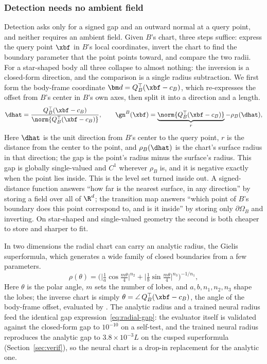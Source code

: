 \subsubsection{Detection needs no ambient field}

Detection asks only for a signed gap and an outward normal at a query point, and neither requires an
ambient field. Given $B$'s chart, three steps suffice: express the query point $\xbf$ in $B$'s local
coordinates, invert the chart to find the boundary parameter that the point points toward, and compare the
two radii. For a star-shaped body all three collapse to almost nothing: the inversion is a closed-form
direction, and the comparison is a single radius subtraction. We first form
the body-frame coordinate $\bm d=Q_B^\top(\xbf-c_B)$, which re-expresses the offset from $B$'s center in
$B$'s own axes, then split it into a direction and a length.
%
\begin{equation}\label{eq:radial-gap}
\dhat=\frac{Q_B^\top(\xbf-c_B)}{\norm{Q_B^\top(\xbf-c_B)}},\qquad
\gn^B(\xbf)=\underbrace{\norm{Q_B^\top(\xbf-c_B)}}_{r}-\rho_B(\dhat),
\end{equation}
%
Here $\dhat$ is the unit direction from $B$'s center to the query point, $r$ is the distance from the
center to the point, and $\rho_B(\dhat)$ is the chart's surface radius in that direction; the gap is the
point's radius minus the surface's radius. This gap is globally single-valued and $C^1$ wherever $\rho_B$
is, and it is negative exactly when the point lies inside. This is the level set turned inside out. A
signed-distance function answers ``how far is the nearest surface, in any direction'' by storing a field
over all of $\R^d$; the transition map answers ``which point of $B$'s boundary does this point correspond
to, and is it inside'' by storing only $\partial\Omega_B$ and inverting. On star-shaped and single-valued
geometry the second is both cheaper to store and sharper to fit.

In two dimensions the radial chart can carry an analytic radius, the Gielis superformula, which generates
a wide family of closed boundaries from a few parameters.
%
\begin{equation}\label{eq:superformula-chart}
\rho(\theta)=\Big(\big\lvert\tfrac1a\cos\tfrac{m\theta}{4}\big\rvert^{n_2}
+\big\lvert\tfrac1b\sin\tfrac{m\theta}{4}\big\rvert^{n_3}\Big)^{-1/n_1},
\end{equation}
%
Here $\theta$ is the polar angle, $m$ sets the number of lobes, and $a,b,n_1,n_2,n_3$ shape the lobes; the
inverse chart is simply $\theta=\angle\,Q_B^\top(\xbf-c_B)$, the angle of the body-frame offset, evaluated
by  \citep{gielis2003generic}. The analytic radius and a trained neural radius feed the
identical gap expression~\eqref{eq:radial-gap}: the evaluator itself is validated against the closed-form
gap to $10^{-10}$ on a self-test, and the trained neural radius reproduces the analytic gap to
$3.8\times10^{-3}L$ on the cusped superformula (Section~\ref{sec:verif}), so the neural chart is a drop-in
replacement for the analytic one.

